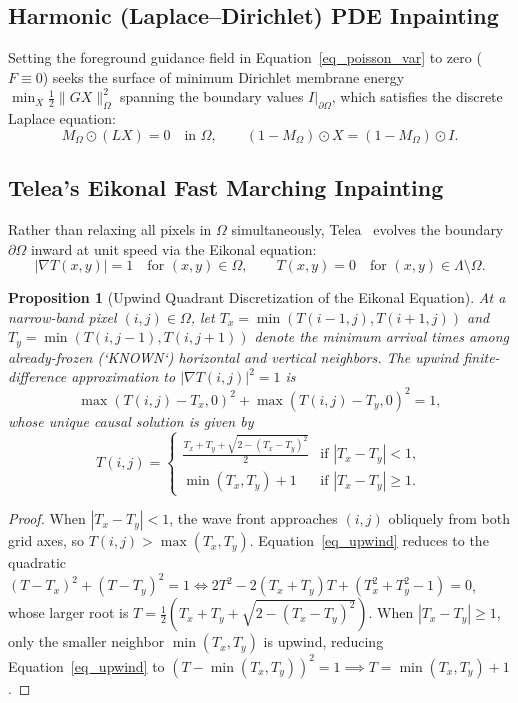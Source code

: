\documentclass{amsart}
\newtheorem{proposition}[theorem]{Proposition}
\begin{document}
\subsection{Harmonic (Laplace--Dirichlet) PDE Inpainting}
Setting the foreground guidance field in Equation~\eqref{eq_poisson_var} to zero ($F \equiv 0$) seeks the surface of minimum Dirichlet membrane energy $\min_X \frac{1}{2}\|G X\|_\Omega^2$ spanning the boundary values $\left.I\right|_{\partial\Omega}$, which satisfies the discrete Laplace equation:
\begin{equation}\label{eq_harmonic_inpaint}
    M_\Omega \odot (L X) = 0 \quad \text{in } \Omega, \qquad (1 - M_\Omega) \odot X = (1 - M_\Omega) \odot I.
\end{equation}

\subsection{Telea's Eikonal Fast Marching Inpainting}
Rather than relaxing all pixels in $\Omega$ simultaneously, Telea~\cite{telea2004} evolves the boundary $\partial\Omega$ inward at unit speed via the Eikonal equation:
\begin{equation}\label{eq_eikonal}
    |\nabla T(x, y)| = 1 \quad \text{for } (x, y) \in \Omega, \qquad T(x, y) = 0 \quad \text{for } (x, y) \in \Lambda \setminus \Omega.
\end{equation}

\begin{proposition}[Upwind Quadrant Discretization of the Eikonal Equation]\label{prop_eikonal}
    At a narrow-band pixel $(i, j) \in \Omega$, let $T_x = \min(T(i-1,j), T(i+1,j))$ and $T_y = \min(T(i,j-1), T(i,j+1))$ denote the minimum arrival times among already-frozen (`KNOWN`) horizontal and vertical neighbors. The upwind finite-difference approximation to $|\nabla T(i,j)|^2 = 1$ is
    \begin{equation}\label{eq_upwind}
        \max(T(i,j) - T_x, 0)^2 + \max(T(i,j) - T_y, 0)^2 = 1,
    \end{equation}
    whose unique causal solution is given by
    \begin{equation}\label{eq_eikonal_sol}
        T(i, j) = \begin{cases}
            \frac{T_x + T_y + \sqrt{2 - (T_x - T_y)^2}}{2} & \text{if } |T_x - T_y| < 1, \\
            \min(T_x, T_y) + 1 & \text{if } |T_x - T_y| \geq 1.
        \end{cases}
    \end{equation}
\end{proposition}
\begin{proof}
    When $|T_x - T_y| < 1$, the wave front approaches $(i,j)$ obliquely from both grid axes, so $T(i,j) > \max(T_x, T_y)$. Equation~\eqref{eq_upwind} reduces to the quadratic $(T - T_x)^2 + (T - T_y)^2 = 1 \iff 2T^2 - 2(T_x + T_y)T + (T_x^2 + T_y^2 - 1) = 0$, whose larger root is $T = \frac{1}{2}(T_x + T_y + \sqrt{2 - (T_x - T_y)^2})$. When $|T_x - T_y| \geq 1$, only the smaller neighbor $\min(T_x, T_y)$ is upwind, reducing Equation~\eqref{eq_upwind} to $(T - \min(T_x, T_y))^2 = 1 \implies T = \min(T_x, T_y) + 1$.
\end{proof}
\end{document}
